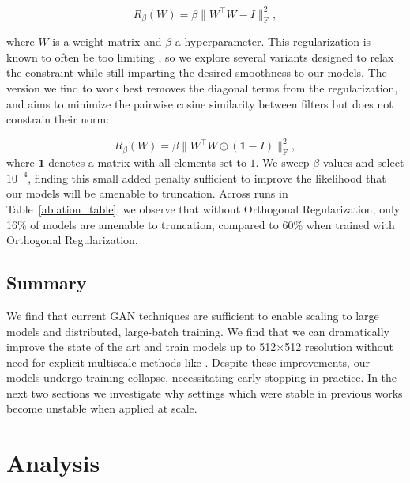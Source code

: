 \documentclass{article} %
\begin{document}
\begin{equation}
    R_\beta(W) = \beta\|W^\top W - I\|_{\mathrm{F}}^2,
\end{equation}




where $W$ is a weight matrix and $\beta$ a hyperparameter. This regularization is known to often be too limiting \citep{miyato2018spectral}, so we explore several variants designed to relax the constraint while still imparting the desired smoothness to our models. The version we find to work best removes the diagonal terms from the regularization, and aims to minimize the pairwise cosine similarity between filters but does not constrain their norm:


\begin{equation}
\label{eq:ortho3}
    R_\beta(W) = \beta\|W^\top W \odot (\mathbf{1} - I)\|_{\mathrm{F}}^2,
\end{equation}
where $\mathbf{1}$ denotes a matrix with all elements set to $1$.
We sweep $\beta$ values and select $10^{-4}$, finding this small added penalty sufficient to improve the likelihood that our models will be amenable to truncation. Across runs in Table~\ref{ablation_table}, we observe that without Orthogonal Regularization, only 16\% of models are amenable to truncation, compared to 60\% when trained with Orthogonal Regularization.




\subsection{Summary}
We find that current GAN techniques are sufficient to enable scaling to large models and distributed, large-batch training. We find that we can  dramatically improve the state of the art and train models up to 512$\times$512 resolution without need for explicit multiscale methods like \cite{karras2018progan}. Despite these improvements, our models undergo training collapse, necessitating early stopping in practice. In the next two sections we investigate why settings which were stable in previous works become unstable when applied at scale. 


\section{Analysis}
\label{sec:analysis}
\end{document}
